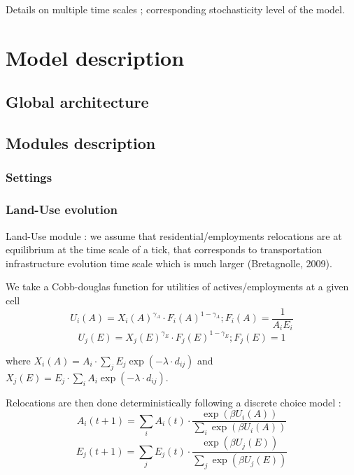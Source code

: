 Details on multiple time scales ; corresponding stochasticity level of the model.






\section{Model description}



\subsection{Global architecture}



\subsection{Modules description}


\subsubsection{Settings}



\subsubsection{Land-Use evolution}




Land-Use module : we assume that residential/employments relocations are at equilibrium at the time scale of a tick, that corresponds to transportation infrastructure evolution time scale which is much larger (Bretagnolle, 2009).

We take a Cobb-douglas function for utilities of actives/employments at a given cell
\[
U_i (A) = X_i(A)^{\gamma_A}\cdot {F_i(A)}^{1-\gamma_A} ; F_i(A) = \frac{1}{A_i E_i}
\]
\[
U_j (E) = X_j(E)^{\gamma_E}\cdot {F_j(E)}^{1-\gamma_E} ; F_j(E) = 1
\]

where $X_i(A) = A_i\cdot \sum_j{E_j \exp{\left(-\lambda\cdot d_{ij}\right)}}$ and $X_j(E) = E_j\cdot \sum_i{A_i \exp{\left(-\lambda\cdot d_{ij}\right)}}$.

Relocations are then done deterministically following a discrete choice model :
\[
A_i(t+1) = \sum_i{A_i(t)}\cdot\frac{\exp{(\beta U_i(A))}}{\sum_i{\exp{(\beta U_i(A))}}}
\]
\[
E_j(t+1) = \sum_j{E_j(t)}\cdot\frac{\exp{(\beta U_j(E))}}{\sum_j{\exp{(\beta U_j(E))}}}
\]





